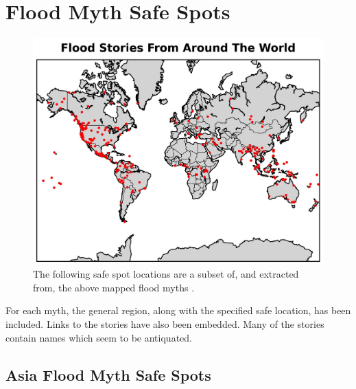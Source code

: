 \documentclass[10pt,twocolumn,letterpaper]{article}
\begin{document}
\clearpage
\twocolumn

\section{Flood Myth Safe Spots}

\begin{figure}[H]
\begin{center}
   \includegraphics[width=1\linewidth]{flood.jpg}
\end{center}
   \caption{The following safe spot locations are a subset of, and extracted from, the above mapped flood myths \cite{2,17}.}
\label{fig:21}
\label{fig:onecol}
\end{figure}

For each myth, the general region, along with the specified safe location, has been included. Links to the stories have also been embedded. Many of the stories contain names which seem to be antiquated.

\subsection{Asia Flood Myth Safe Spots}
\end{document}
